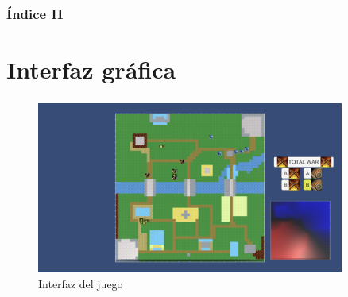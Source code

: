 \documentclass[bigger]{beamer}
\begin{document}
{ %
\begin{frame}
\frametitle{Índice \RN{2}} %
\rmfamily %
\color{white}
\tableofcontents[hideallsubsections, sections={5-}]
\end{frame}
}

\section{Interfaz gráfica}

\begin{frame}[b]
\frametitle{\secname} %
\framesubtitle{} %
\rmfamily %
\color{black} %
\begin{figure}
    \centering
    \includegraphics[width=0.9\textwidth]{interfaz.png}
    \caption{Interfaz del juego}
\end{figure}
\end{frame}
\end{document}
